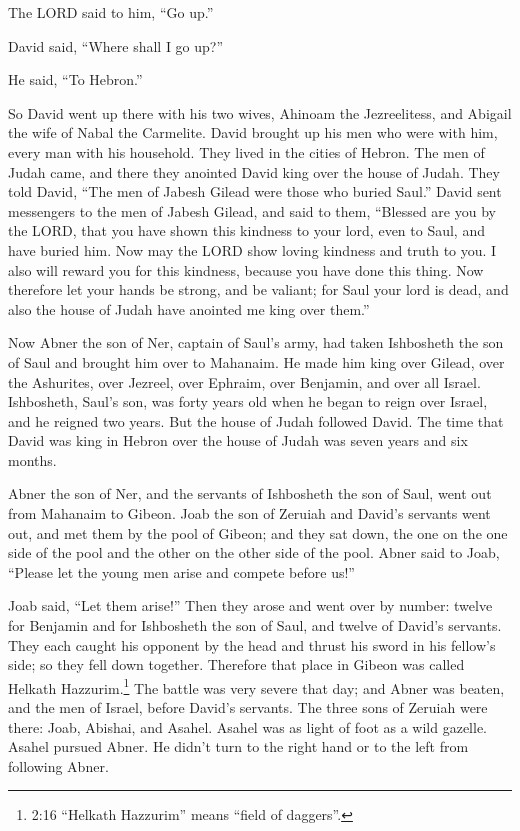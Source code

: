 The LORD said to him, ``Go up.''

David said, ``Where shall I go up?''

He said, ``To Hebron.''

 So David went up there with his two wives, Ahinoam the
Jezreelitess, and Abigail the wife of Nabal the Carmelite. 
David brought up his men who were with him, every man with his
household. They lived in the cities of Hebron.  The men of
Judah came, and there they anointed David king over the house of Judah.
They told David, ``The men of Jabesh Gilead were those who buried
Saul.''  David sent messengers to the men of Jabesh Gilead,
and said to them, ``Blessed are you by the LORD, that you have shown
this kindness to your lord, even to Saul, and have buried him.
 Now may the LORD show loving kindness and truth to you. I
also will reward you for this kindness, because you have done this
thing.  Now therefore let your hands be strong, and be
valiant; for Saul your lord is dead, and also the house of Judah have
anointed me king over them.''

 Now Abner the son of Ner, captain of Saul's army, had taken
Ishbosheth the son of Saul and brought him over to Mahanaim.
 He made him king over Gilead, over the Ashurites, over
Jezreel, over Ephraim, over Benjamin, and over all Israel. 
Ishbosheth, Saul's son, was forty years old when he began to reign over
Israel, and he reigned two years. But the house of Judah followed David.
 The time that David was king in Hebron over the house of
Judah was seven years and six months.

 Abner the son of Ner, and the servants of Ishbosheth the
son of Saul, went out from Mahanaim to Gibeon.  Joab the
son of Zeruiah and David's servants went out, and met them by the pool
of Gibeon; and they sat down, the one on the one side of the pool and
the other on the other side of the pool.  Abner said to
Joab, ``Please let the young men arise and compete before us!''

Joab said, ``Let them arise!''  Then they arose and went
over by number: twelve for Benjamin and for Ishbosheth the son of Saul,
and twelve of David's servants.  They each caught his
opponent by the head and thrust his sword in his fellow's side; so they
fell down together. Therefore that place in Gibeon was called Helkath
Hazzurim.\footnote{2:16 ``Helkath Hazzurim'' means ``field of daggers''.}
 The battle was very severe that day; and Abner was beaten,
and the men of Israel, before David's servants.  The three
sons of Zeruiah were there: Joab, Abishai, and Asahel. Asahel was as
light of foot as a wild gazelle.  Asahel pursued Abner. He
didn't turn to the right hand or to the left from following Abner.

